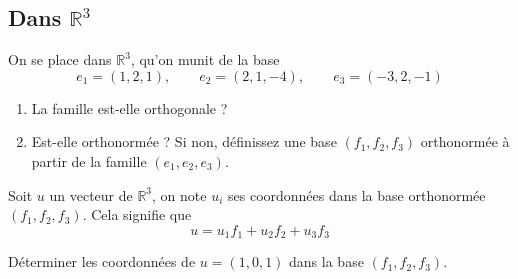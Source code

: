 \vspace{1em}

\subsection{Dans $\mathbb{R}^3$}

On se place dans $\mathbb{R}^3$, qu'on munit de la base 
$$e_1 = (1,2,1), \qquad e_2 = (2,1,-4), \qquad e_3 = (-3,2,-1)$$

\begin{enumerate}
\item La famille est-elle orthogonale ? 
\item Est-elle orthonormée ? Si non, définissez une base $(f_1,f_2,f_3)$ orthonormée à partir de la famille $(e_1,e_2,e_3)$. 
\end{enumerate}

Soit $u$ un vecteur de $\mathbb{R}^3$, on note $u_i$ ses coordonnées dans la base orthonormée $(f_1,f_2,f_3)$. Cela signifie que 
$$u = u_1 f_1 + u_2 f_2 + u_3 f_3$$

Déterminer les coordonnées de $u = (1,0,1)$ dans la base $(f_1,f_2,f_3)$.

